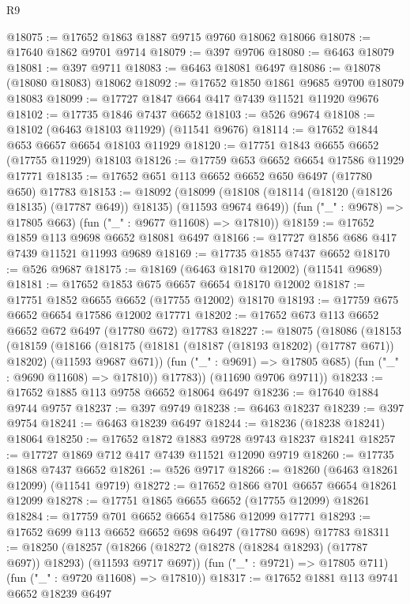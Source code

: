 \begin{lexlean}{R9}
\begin{coremodule}
@18075 := @17652 @1863 @1887 @9715 @9760 @18062 @18066
@18078 := @17640 @1862 @9701 @9714
@18079 := @397 @9706
@18080 := @6463 @18079
@18081 := @397 @9711
@18083 := @6463 @18081 @6497
@18086 := @18078 (@18080 @18083) @18062
@18092 := @17652 @1850 @1861 @9685 @9700 @18079 @18083
@18099 := @17727 @1847 @664 @417 @7439 @11521 @11920 @9676
@18102 := @17735 @1846 @7437 @6652
@18103 := @526 @9674
@18108 := @18102 (@6463 @18103 @11929) (@11541 @9676)
@18114 := @17652 @1844 @653 @6657 @6654 @18103 @11929
@18120 := @17751 @1843 @6655 @6652 (@17755 @11929) @18103
@18126 := @17759 @653 @6652 @6654 @17586 @11929 @17771
@18135 := @17652 @651 @113 @6652 @6652 @650 @6497 (@17780 @650) @17783
@18153 := @18092
    (@18099
      (@18108 (@18114 (@18120 (@18126 @18135) (@17787 @649)) @18135) (@11593 @9674 @649))
      (fun ("_" : @9678) => @17805 @663)
      (fun ("_" : @9677 @11608) => @17810))
@18159 := @17652 @1859 @113 @9698 @6652 @18081 @6497
@18166 := @17727 @1856 @686 @417 @7439 @11521 @11993 @9689
@18169 := @17735 @1855 @7437 @6652
@18170 := @526 @9687
@18175 := @18169 (@6463 @18170 @12002) (@11541 @9689)
@18181 := @17652 @1853 @675 @6657 @6654 @18170 @12002
@18187 := @17751 @1852 @6655 @6652 (@17755 @12002) @18170
@18193 := @17759 @675 @6652 @6654 @17586 @12002 @17771
@18202 := @17652 @673 @113 @6652 @6652 @672 @6497 (@17780 @672) @17783
@18227 := @18075
    (@18086
      (@18153
        (@18159
          (@18166
            (@18175 (@18181 (@18187 (@18193 @18202) (@17787 @671)) @18202) (@11593 @9687 @671))
            (fun ("_" : @9691) => @17805 @685)
            (fun ("_" : @9690 @11608) => @17810))
          @17783))
      (@11690 @9706 @9711))
@18233 := @17652 @1885 @113 @9758 @6652 @18064 @6497
@18236 := @17640 @1884 @9744 @9757
@18237 := @397 @9749
@18238 := @6463 @18237
@18239 := @397 @9754
@18241 := @6463 @18239 @6497
@18244 := @18236 (@18238 @18241) @18064
@18250 := @17652 @1872 @1883 @9728 @9743 @18237 @18241
@18257 := @17727 @1869 @712 @417 @7439 @11521 @12090 @9719
@18260 := @17735 @1868 @7437 @6652
@18261 := @526 @9717
@18266 := @18260 (@6463 @18261 @12099) (@11541 @9719)
@18272 := @17652 @1866 @701 @6657 @6654 @18261 @12099
@18278 := @17751 @1865 @6655 @6652 (@17755 @12099) @18261
@18284 := @17759 @701 @6652 @6654 @17586 @12099 @17771
@18293 := @17652 @699 @113 @6652 @6652 @698 @6497 (@17780 @698) @17783
@18311 := @18250
    (@18257
      (@18266 (@18272 (@18278 (@18284 @18293) (@17787 @697)) @18293) (@11593 @9717 @697))
      (fun ("_" : @9721) => @17805 @711)
      (fun ("_" : @9720 @11608) => @17810))
@18317 := @17652 @1881 @113 @9741 @6652 @18239 @6497

\end{coremodule}
\end{lexlean}
